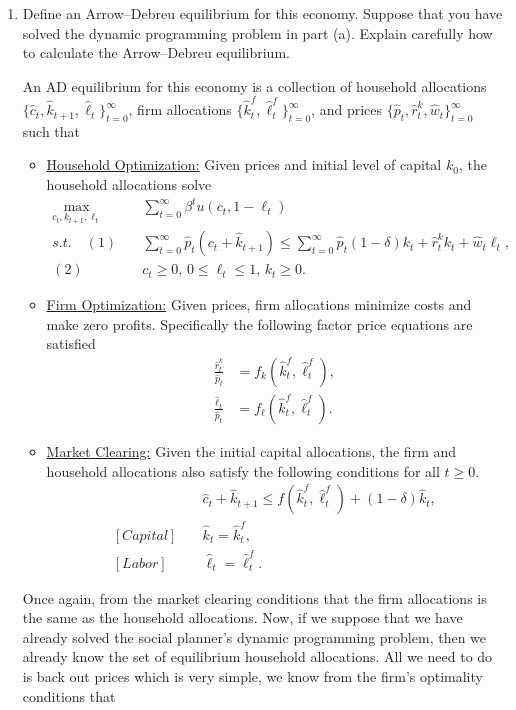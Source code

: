 \documentclass[11pt,english]{article}
\begin{document}
\begin{enumerate}
    \item[(c)] Define an Arrow--Debreu equilibrium for this economy. Suppose
        that you have solved the dynamic programming problem in part (a). Explain
        carefully how to calculate the Arrow--Debreu equilibrium.
    \begin{solution}
 An AD equilibrium for this economy is a collection of household allocations $\{\hat{c}_t, \hat{k}_{t+1}, \hat{\ell}_t\}_{t=0}^\infty$, firm allocations $\{\hat{k}_t^f, \hat{\ell}_t^f\}_{t = 0}^\infty$, and prices $\{\hat{p}_t, \hat{r}_t^k, \hat{w}_t\}_{t=0}^\infty$ such that 
\begin{itemize}
\item \underline{Household Optimization:} Given prices and initial level of capital $k_0$, the household allocations solve 
\begin{align*}
\max_{c_t, k_{t+1}, \ell_t} &\quad \sum_{t=0}^\infty\beta^t u(c_t, 1 - \ell_t)\\
s.t.\quad (1)&\quad \sum_{t = 0}^\infty\hat{p}_t (c_t + \hat{k}_{t+1}) \leq \sum_{t = 0}^\infty \hat{p}_t(1 - \delta) k_t + \hat{r}_t^k k_t + \hat{w}_t \ell_t,\\
(2)&\quad c_t \geq 0, \,0 \leq \ell_t \leq 1,\, k_t \geq 0.
\end{align*}
\item  \underline{Firm Optimization:} Given prices, firm allocations minimize costs and make zero profits. Specifically the following factor price equations are satisfied
\begin{align*}
\frac{\hat{r}_t^k}{\hat{p}_t} &= f_k\left(\hat{k}_t^f, \hat{\ell}_t^f\right),\\
\frac{\hat{\ell}_t}{\hat{p}_t} &= f_\ell\left(\hat{k}_t^f, \hat{\ell}_t^f\right).
\end{align*}
\item \underline{Market Clearing:} Given the initial capital allocations, the firm and household allocations also satisfy the following conditions for all $t\geq 0$.
\begin{align*}
[Goods]&\quad \hat{c}_t + \hat{k}_{t+1} \leq f\left(\hat{k}_t^f, \hat{\ell}_t^f\right) + (1 - \delta)\hat{k}_t,\\
[Capital]&\quad \hat{k}_t = \hat{k}_t^f,\\
[Labor]&\quad \hat{\ell}_t = \hat{\ell}_t^f.
\end{align*}
\end{itemize}
Once again, from the market clearing conditions that the firm allocations is the same as the household allocations. Now, if we suppose that we have already solved the social planner's dynamic programming problem, then we already know the set of equilibrium household allocations. All we need to do is back out prices which is very simple, we know from the firm's optimality conditions that 

\end{solution}
\end{enumerate}
\end{document}
